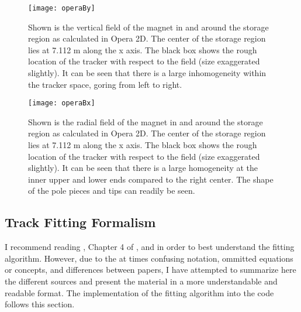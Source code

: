 \begin{figure}[]
	\caption[Vertical magnetic field from Opera2D]{Shown is the vertical field of the \gmtwo magnet in and around the storage region as calculated in Opera 2D. The center of the storage region lies at 7.112 m along the x axis. The black box shows the rough location of the tracker with respect to the field (size exaggerated slightly). It can be seen that there is a large inhomogeneity within the tracker space, goring from left to right.}
	\centering
	\texttt{[image: operaBy]}
	\label{fig:operaBy}
\end{figure}

\begin{figure}[]
	\caption[Horizontal magnetic field from Opera2D]{Shown is the radial field of the \gmtwo magnet in and around the storage region as calculated in Opera 2D. The center of the storage region lies at 7.112 m along the x axis. The black box shows the rough location of the tracker with respect to the field (size exaggerated slightly). It can be seen that there is a large homogeneity at the inner upper and lower ends compared to the right center. The shape of the pole pieces and tips can readily be seen.}
	\centering
	\texttt{[image: operaBx]}
	\label{fig:operaBx}
\end{figure}



\subsection{Track Fitting Formalism}
\label{sec:TrackFittingFormalism}

    I recommend reading \cite{geanemanual}, Chapter 4 of \cite{Lavezzi}, and \cite{trajfit} in order to best understand the fitting algorithm. However, due to the at times confusing notation, ommitted equations or concepts, and differences between papers, I have attempted to summarize here the different sources and present the material in a more understandable and readable format. The implementation of the fitting algorithm into the code follows this section.

